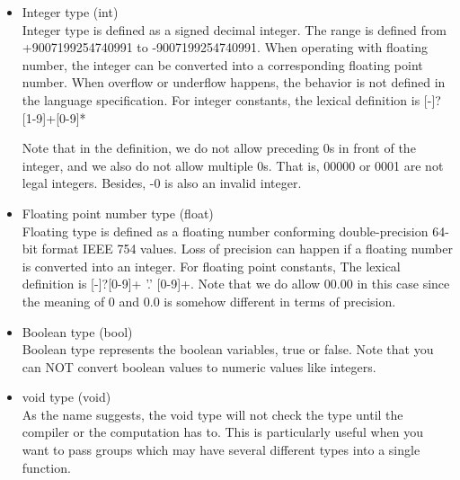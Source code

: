 \documentclass[11pt,letterpaper]{article}
\begin{document}
\begin{itemize}
\item Integer type (int) \\
Integer type is defined as a signed decimal integer. The range is defined from +9007199254740991 to -9007199254740991. When operating with floating number, the integer can be converted into a corresponding floating point number. When overflow or underflow happens, the behavior is not defined in the language specification. For integer constants, the lexical definition is [-]?[1-9]+[0-9]* \textbar [0]

Note that in the definition, we do not allow preceding 0s in front of the integer, and we also do not allow multiple 0s. That is, 00000 or 0001 are not legal integers. Besides, -0 is also an invalid integer.

\item Floating point number type (float) \\
Floating type is defined as a floating number conforming double-precision 64-bit format IEEE 754 values. Loss of precision can happen if a floating number is converted into an integer. For floating point constants, The lexical definition is [-]?[0-9]+ '.' [0-9]+. Note that we do allow 00.00 in this case since the meaning of 0 and 0.0 is somehow different in terms of precision.

\item Boolean type (bool) \\
Boolean type represents the boolean variables, true or false. Note that you can NOT convert boolean values to numeric values like integers.

\item void type (void) \\
As the name suggests, the void type will not check the type until the compiler or the computation has to. This is particularly useful when you want to pass groups which may have several different types into a single function.
\end{itemize}
\end{document}
